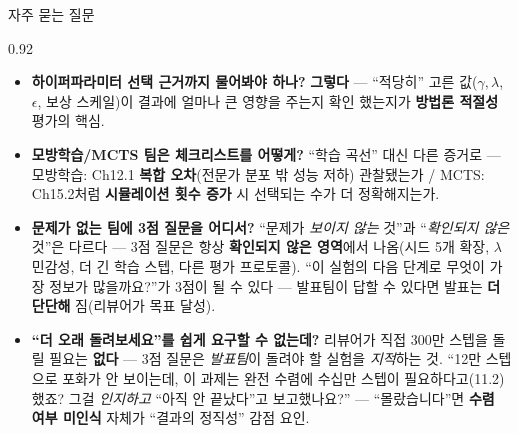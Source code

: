 \begin{frame}{자주 묻는 질문}
\begin{center}\begin{varwidth}{0.92\textwidth}
  \small
  \begin{itemize}
    \item \textbf{하이퍼파라미터 선택 근거까지 물어봐야 하나?}
      \textbf{그렇다} — ``적당히'' 고른 값($\gamma, \lambda$,
      $\epsilon$, 보상 스케일)이 결과에 얼마나 큰 영향을 주는지 확인
      했는지가 \textbf{방법론 적절성} 평가의 핵심.
    \item \textbf{모방학습/MCTS 팀은 체크리스트를 어떻게?} ``학습
      곡선'' 대신 다른 증거로 — 모방학습: Ch12.1 \textbf{복합
      오차}(전문가 분포 밖 성능 저하) 관찰됐는가 / MCTS: Ch15.2처럼
      \textbf{시뮬레이션 횟수 증가} 시 선택되는 수가 더 정확해지는가.
    \item \textbf{문제가 없는 팀에 3점 질문을 어디서?} ``문제가
      \emph{보이지 않는} 것''과 ``\emph{확인되지 않은} 것''은 다르다 —
      3점 질문은 항상 \textbf{확인되지 않은 영역}에서 나옴(시드 5개
      확장, $\lambda$ 민감성, 더 긴 학습 스텝, 다른 평가 프로토콜).
      ``이 실험의 다음 단계로 무엇이 가장 정보가 많을까요?''가 3점이
      될 수 있다 — 발표팀이 답할 수 있다면 발표는 \textbf{더 단단해}
      짐(리뷰어가 목표 달성).
    \item \textbf{``더 오래 돌려보세요''를 쉽게 요구할 수 없는데?}
      리뷰어가 직접 300만 스텝을 돌릴 필요는 \textbf{없다} — 3점
      질문은 \emph{발표팀}이 돌려야 할 실험을 \emph{지적}하는 것.
      ``12만 스텝으로 포화가 안 보이는데, 이 과제는 완전 수렴에 수십만
      스텝이 필요하다고(11.2) 했죠? 그걸 \emph{인지하고} ``아직
      안 끝났다''고 보고했나요?'' — ``몰랐습니다''면 \textbf{수렴
      여부 미인식} 자체가 ``결과의 정직성'' 감점 요인.
  \end{itemize}
\end{varwidth}\end{center}
\end{frame}

